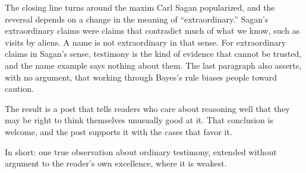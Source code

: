 \begin{afterword}
The closing line turns around the maxim Carl Sagan popularized, and the reversal depends on a change in the meaning of ``extraordinary.'' Sagan's extraordinary claims were claims that contradict much of what we know, such as visits by aliens. A name is not extraordinary in that sense. For extraordinary claims in Sagan's sense, testimony is the kind of evidence that cannot be trusted, and the name example says nothing about them. The last paragraph also asserts, with no argument, that working through Bayes's rule biases people toward caution.

The result is a post that tells readers who care about reasoning well that they may be right to think themselves unusually good at it. That conclusion is welcome, and the post supports it with the cases that favor it.

In short: one true observation about ordinary testimony, extended without argument to the reader's own excellence, where it is weakest.
\end{afterword}
